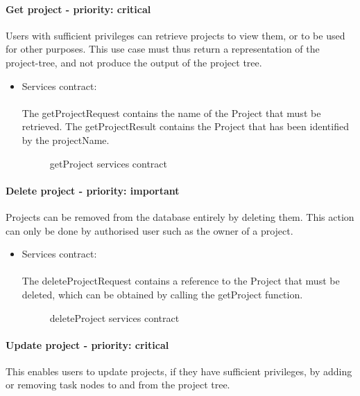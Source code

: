 \paragraph{Get project - priority: critical}
Users with sufficient privileges can retrieve projects to view them, or to be used for other purposes. This use case must thus return a representation of the project-tree, and not produce the output of the project tree.

\begin{itemize}
	\item Services contract:\\ \\
	The getProjectRequest contains the name of the Project that must be retrieved. The getProjectResult contains the Project that has been identified by the projectName.
	\begin{figure}[H]
    	\centering
    	\caption{getProject services contract}
    	\label{fig:getProject_services_contract}
   	\end{figure}
\end{itemize}

\paragraph{Delete project - priority: important}
Projects can be removed from the database entirely by deleting them. This action can only be done by authorised user such as the owner of a project.

\begin{itemize}
	\item Services contract:\\ \\
	The deleteProjectRequest contains a reference to the Project that must be deleted, which can be obtained by calling the getProject function.
	\begin{figure}[H]
    	\centering
    	\caption{deleteProject services contract}
    	\label{fig:deleteProject_services_contract}
   	\end{figure}
\end{itemize}


\paragraph{Update project - priority: critical}
This enables users to update projects, if they have sufficient privileges, by adding or removing task nodes to and from the project tree.

